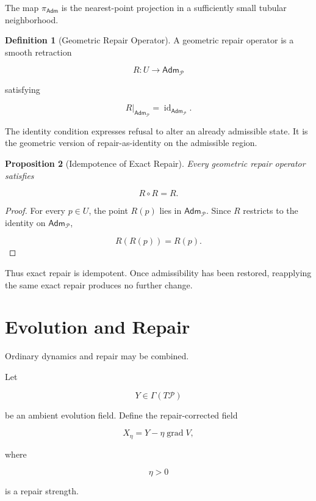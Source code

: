 \documentclass[11pt,oneside]{book}
\numberwithin{equation}{chapter}
\theoremstyle{definition}
\newtheorem{definition}{Definition}[chapter]
\theoremstyle{plain}
\newtheorem{proposition}[definition]{Proposition}
\DeclareMathOperator{\id}{id}
\DeclareMathOperator{\grad}{grad}
\newcommand{\Adm}{\mathsf{Adm}}
\begin{document}
The map \(\pi_{\Adm}\) is the nearest-point projection in a sufficiently
small tubular neighborhood.

\begin{definition}[Geometric Repair Operator]

A geometric repair operator is a smooth retraction

\[
R:U\longrightarrow\Adm_{\mathcal P}
\]

satisfying

\[
R|_{\Adm_{\mathcal P}}
=
\id_{\Adm_{\mathcal P}}.
\]

\end{definition}

The identity condition expresses refusal to alter an already admissible
state. It is the geometric version of repair-as-identity on the admissible
region.

\begin{proposition}[Idempotence of Exact Repair]

Every geometric repair operator satisfies

\[
R\circ R
=
R.
\]

\end{proposition}

\begin{proof}

For every \(p\in U\), the point \(R(p)\) lies in
\(\Adm_{\mathcal P}\). Since \(R\) restricts to the identity on
\(\Adm_{\mathcal P}\),

\[
R(R(p))
=
R(p).
\]

\end{proof}

Thus exact repair is idempotent. Once admissibility has been restored,
reapplying the same exact repair produces no further change.

\section{Evolution and Repair}

Ordinary dynamics and repair may be combined.

Let

\[
Y\in\Gamma(T\mathcal P)
\]

be an ambient evolution field. Define the repair-corrected field

\[
X_\eta
=
Y
-
\eta\grad V,
\]

where

\[
\eta>0
\]

is a repair strength.
\end{document}
